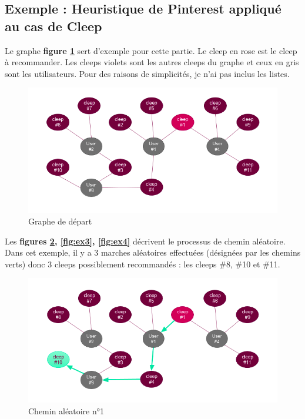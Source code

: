 \documentclass{article} %
\begin{document}
\subsection{Exemple : Heuristique de Pinterest appliqué au cas de Cleep}

Le graphe \textbf{figure \ref{fig:ex1}} sert d'exemple pour cette partie. Le cleep en rose est le cleep à recommander. Les cleeps violets sont les autres cleeps du graphe et ceux en gris sont les utilisateurs. Pour des raisons de simplicités, je n'ai pas inclus les listes.
\begin{figure}[!h]
 \centering
 \includegraphics[keepaspectratio = true,scale=0.6]{ex1}
 \caption{Graphe de départ}
 \label{fig:ex1}
\end{figure}

Les \textbf{figures \ref{fig:ex2}, \ref{fig:ex3}, \ref{fig:ex4}} décrivent le processus de chemin aléatoire. Dans cet exemple, il y a 3 marches aléatoires effectuées (désignées par les chemins verts) donc 3 cleeps possiblement recommandés : les cleeps \#8, \#10 et \#11.
\begin{figure}[!h]
 \centering
 \includegraphics[keepaspectratio = true,scale=0.6]{ex2}
 \caption{Chemin aléatoire n°1}
 \label{fig:ex2}
\end{figure}
\end{document}
